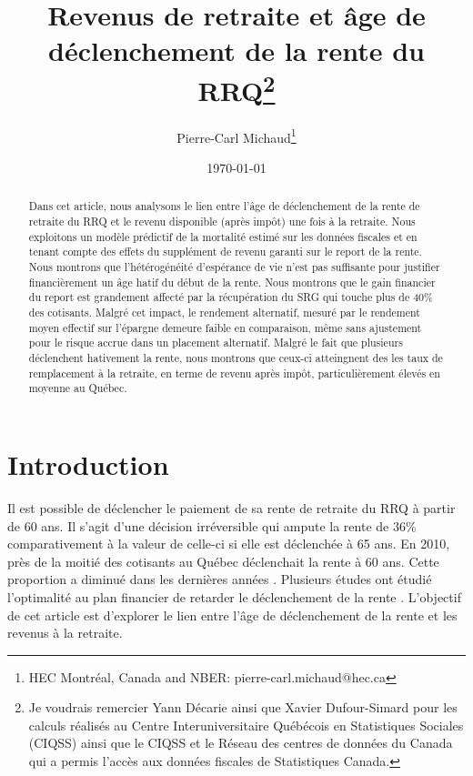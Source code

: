 \documentclass[french, 12pt]{article}
\title{Revenus de retraite et âge de déclenchement de la rente du RRQ\thanks{\scriptsize Je voudrais remercier Yann Décarie ainsi que Xavier Dufour-Simard pour les calculs réalisés au Centre Interuniversitaire Québécois en Statistiques Sociales (CIQSS) ainsi que le CIQSS et le Réseau des centres de données du Canada qui a permis l'accès aux données fiscales de Statistiques Canada.  
}}
\author{\small Pierre-Carl Michaud\thanks{\scriptsize HEC Montréal, Canada and NBER: pierre-carl.michaud@hec.ca}}
\date{\small \today}
\begin{document}
	
	\maketitle
	
	\begin{abstract}
		\footnotesize 
        Dans cet article, nous analysons le lien entre l'âge de déclenchement de la rente de retraite du RRQ et le revenu disponible (après impôt) une fois à la retraite. Nous exploitons un modèle prédictif de la mortalité estimé sur les données fiscales et en tenant compte des effets du supplément de revenu garanti sur le report de la rente. Nous montrons que l'hétérogénéité d'espérance de vie n'est pas suffisante pour justifier financièrement un âge hatif du début de la rente. Nous montrons que le gain financier du report est grandement affecté par la récupération du SRG qui touche plus de 40\% des cotisants. Malgré cet impact, le rendement alternatif, mesuré par le rendement moyen effectif sur l'épargne demeure faible en comparaison, même sans ajustement pour le risque accrue dans un placement alternatif.  Malgré le fait que plusieurs déclenchent hativement la rente,  nous montrons que ceux-ci atteingnent des les taux de remplacement à la retraite, en terme de revenu après impôt, particulièrement élevés en moyenne au Québec. 
	\end{abstract}

	
	\thispagestyle{empty}
	
	\clearpage
	
	\setcounter{page}{1}
	\normalsize 
	
	\onehalfspacing
	
	
	\newpage
	
	
	\section{Introduction}
	
	Il est possible de déclencher le paiement de  sa rente de retraite du RRQ à partir de 60 ans. Il s’agit d’une décision irréversible qui ampute la rente de 36\% comparativement à la valeur de celle-ci si elle est déclenchée à 65 ans. En 2010, près de la moitié des cotisants au Québec déclenchait la rente à 60 ans. Cette proportion a diminué dans les dernières années \citep{michaud2023}. Plusieurs études ont étudié l'optimalité au plan financier de retarder le déclenchement de la rente \citep{milliganschirle2008, michaud2020,macdonald2020,laverdiere2023}.  L'objectif de cet article est d'explorer le lien entre l'âge de déclenchement de la rente et les revenus à la retraite. 
	
\end{document}
